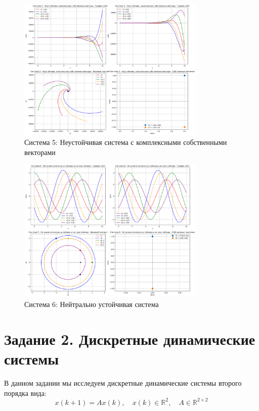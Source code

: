\begin{figure}[h!]
\centering
\includegraphics[width=0.8\textwidth]{images/task1/система_5_-_неустойчива,_комплексные_собственные_векторы.png}
\caption{Система 5: Неустойчивая система с комплексными собственными векторами}
\label{fig:system5}
\end{figure}

\begin{figure}[h!]
\centering
\includegraphics[width=0.8\textwidth]{images/task1/система_6_-_не_асимптотически_устойчива_и_не_неустойчива.png}
\caption{Система 6: Нейтрально устойчивая система}
\label{fig:system6}
\end{figure}

\section{Задание 2. Дискретные динамические системы}

В данном задании мы исследуем дискретные динамические системы второго порядка вида:
\begin{equation}
x(k+1) = Ax(k), \quad x(k) \in \mathbb{R}^2, \quad A \in \mathbb{R}^{2 \times 2}
\end{equation}

